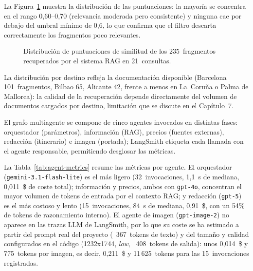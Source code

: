 La Figura~\ref{fig:rag-histogram} muestra la distribución de las puntuaciones: la mayoría se concentra en el rango 0{,}60--0{,}70 (relevancia moderada pero consistente) y ninguna cae por debajo del umbral mínimo de 0{,}6, lo que confirma que el filtro descarta correctamente los fragmentos poco relevantes.

\begin{figure}[htbp]
\centering
{}
\caption{Distribución de puntuaciones de similitud de los 235~fragmentos recuperados por el sistema RAG en 21~consultas.}
\label{fig:rag-histogram}
\end{figure}

La distribución por destino refleja la documentación disponible (Barcelona 101~fragmentos, Bilbao 65, Alicante 42, frente a menos en La~Coruña o Palma de Mallorca): la calidad de la recuperación depende directamente del volumen de documentos cargados por destino, limitación que se discute en el Capítulo~7.

\TFMTOCPageBreak

El grafo multiagente se compone de cinco agentes invocados en distintas fases: orquestador (parámetros), información (RAG), precios (fuentes externas), redacción (itinerario) e imagen (portada); LangSmith etiqueta cada llamada con el agente responsable, permitiendo desglosar las métricas.

La Tabla~\ref{tab:agent-metrics} resume las métricas por agente. El orquestador (\texttt{gemini-3.1-flash-lite}) es el más ligero (32~invocaciones, 1{,}1~s de mediana, 0{,}011~\$ de coste total); información y precios, ambos con \texttt{gpt-4o}, concentran el mayor volumen de tokens de entrada por el contexto RAG; y redacción (\texttt{gpt-5}) es el más costoso y lento (15~invocaciones, 84~s de mediana, 0{,}91~\$, con un 54\% de tokens de razonamiento interno). El agente de imagen (\texttt{gpt-image-2}) no aparece en las trazas LLM de LangSmith, por lo que su coste se ha estimado a partir del prompt real del proyecto (~367~tokens de texto) y del tamaño y calidad configurados en el código (1232x1744, \textit{low}, ~408~tokens de salida): unos 0{,}014~\$ y 775~tokens por imagen, es decir, 0{,}211~\$ y 11\,625~tokens para las 15~invocaciones registradas.

